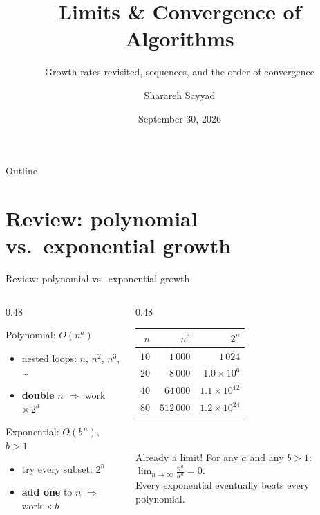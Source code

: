 \documentclass[aspectratio=169]{beamer}
\title{Limits \& Convergence of Algorithms}
\subtitle{Growth rates revisited, sequences, and the order of convergence}
\author{Sharareh Sayyad}
\institute{Washington state University}
\date{September 30, 2026}
\begin{document}
\frame{\titlepage}

\begin{frame}{Outline}
\tableofcontents
\end{frame}

\section{Review: polynomial vs.\ exponential growth}

\begin{frame}{Review: polynomial vs.\ exponential growth}
\begin{columns}[T]
\begin{column}{0.48\textwidth}
\begin{block}{Polynomial: $O(n^a)$}
\small
\begin{itemize}
  \item nested loops: $n$, $n^2$, $n^3$, \ldots
  \item \textbf{double} $n$ $\Rightarrow$ work $\times\,2^a$
\end{itemize}
\end{block}
\begin{block}{Exponential: $O(b^{\,n})$, \ $b > 1$}
\small
\begin{itemize}
  \item try every subset: $2^n$
  \item \textbf{add one} to $n$ $\Rightarrow$ work $\times\,b$
\end{itemize}
\end{block}
\end{column}
\begin{column}{0.48\textwidth}
\centering
\small
\renewcommand{\arraystretch}{1.15}
\begin{tabular}{rrr}
\toprule
$n$ & $n^3$ & $2^n$ \\
\midrule
$10$ & $1\,000$ & $1\,024$ \\
$20$ & $8\,000$ & $1.0\times10^{6}$ \\
$40$ & $64\,000$ & $1.1\times10^{12}$ \\
$80$ & $512\,000$ & $1.2\times10^{24}$ \\
\bottomrule
\end{tabular}\\[8pt]
\begin{exampleblock}{Already a limit!}
\footnotesize For any $a$ and any $b > 1$:
\ $\displaystyle\lim_{n\to\infty} \frac{n^a}{b^{\,n}} = 0$.\\
Every exponential eventually beats every polynomial.
\end{exampleblock}
\end{column}
\end{columns}
\end{frame}
\end{document}

